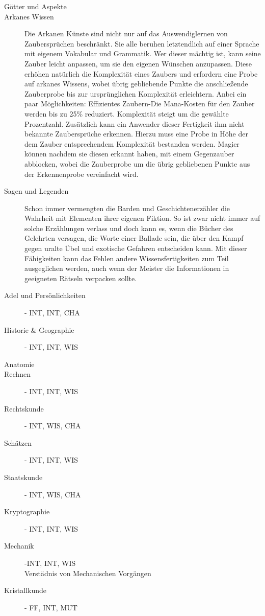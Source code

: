\documentclass[a4paper,12pt,oneside]{book}
\begin{document}
\begin{description}
\item[Götter und Aspekte]
\item[Arkanes Wissen]Die Arkanen Künste sind nicht nur auf das Auswendiglernen von Zaubersprüchen beschränkt. Sie alle beruhen letztendlich auf einer Sprache mit eigenem Vokabular und Grammatik. Wer dieser mächtig ist, kann seine Zauber leicht anpassen, um sie den eigenen Wünschen anzupassen. Diese erhöhen natürlich die Komplexität eines Zaubers und erfordern eine Probe auf arkanes Wissens, wobei übrig gebliebende Punkte die anschließende Zauberprobe bis zur ursprünglichen Komplexität erleichtern. Anbei ein paar Möglichkeiten:
Effizientes Zaubern-Die Mana-Kosten für den Zauber werden bis zu 25\% reduziert. Komplexität steigt um die gewählte Prozentzahl.
Zusätzlich kann ein Anwender dieser Fertigkeit ihm nicht bekannte Zaubersprüche erkennen. Hierzu muss eine Probe in Höhe der dem Zauber entsprechendem Komplexität bestanden werden. Magier können nachdem sie diesen erkannt haben, mit einem Gegenzauber abblocken, wobei die Zauberprobe um die übrig gebliebenen Punkte aus der Erkennenprobe vereinfacht wird.
\item[Sagen und Legenden]Schon immer vermengten die Barden und Geschichtenerzähler die Wahrheit mit Elementen ihrer eigenen Fiktion. So ist zwar nicht immer auf solche Erzählungen verlass und doch kann es, wenn die Bücher des Gelehrten versagen, die Worte einer Ballade sein, die über den Kampf gegen uralte Übel und exotische Gefahren entscheiden kann. Mit dieser Fähigkeiten kann das Fehlen andere Wissensfertigkeiten zum Teil ausgeglichen werden, auch wenn der Meister die Informationen in geeigneten Rätseln verpacken sollte.
\item[Adel und Persönlichkeiten]- INT, INT, CHA
\item[Historie \& Geographie]- INT, INT, WIS
\item[Anatomie]
\item[Rechnen]- INT, INT, WIS
\item[Rechtskunde]- INT, WIS, CHA
\item[Schätzen]- INT, INT, WIS
\item[Staatskunde]- INT, WIS, CHA
\item[Kryptographie]- INT, INT, WIS
\item[Mechanik]-INT, INT, WIS
\\Verstädnis von Mechanischen Vorgängen
\item[Kristallkunde]- FF, INT, MUT
\end{description}
\end{document}
